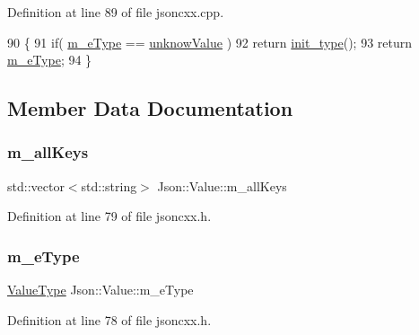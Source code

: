 Definition at line 89 of file jsoncxx.\+cpp.


\begin{DoxyCode}
90     \{
91         \textcolor{keywordflow}{if}( \hyperlink{class_json_1_1_value_ae6116e08a5c1833f858c1d29156365b1}{m\_eType} == \hyperlink{namespace_json_a7d654b75c16a57007925868e38212b4eaf3bec0dbeafa6b0fdc48db16179b6369}{unknowValue} )
92             \textcolor{keywordflow}{return} \hyperlink{class_json_1_1_value_ad24bf765750e8ea535d28bcf981d551a}{init\_type}();
93         \textcolor{keywordflow}{return} \hyperlink{class_json_1_1_value_ae6116e08a5c1833f858c1d29156365b1}{m\_eType};
94     \}
\end{DoxyCode}


\subsection{Member Data Documentation}
\mbox{\label{class_json_1_1_value_a914e4896d12ffa87726125d2f60ea9c0}} 
\subsubsection{\texorpdfstring{m\+\_\+all\+Keys}{m\_allKeys}}
{\footnotesize\ttfamily std\+::vector$<$std\+::string$>$ Json\+::\+Value\+::m\+\_\+all\+Keys\hspace{0.3cm}{\ttfamily [protected]}}



Definition at line 79 of file jsoncxx.\+h.

\mbox{\label{class_json_1_1_value_ae6116e08a5c1833f858c1d29156365b1}} 
\subsubsection{\texorpdfstring{m\+\_\+e\+Type}{m\_eType}}
{\footnotesize\ttfamily \hyperlink{namespace_json_a7d654b75c16a57007925868e38212b4e}{Value\+Type} Json\+::\+Value\+::m\+\_\+e\+Type\hspace{0.3cm}{\ttfamily [protected]}}



Definition at line 78 of file jsoncxx.\+h.

